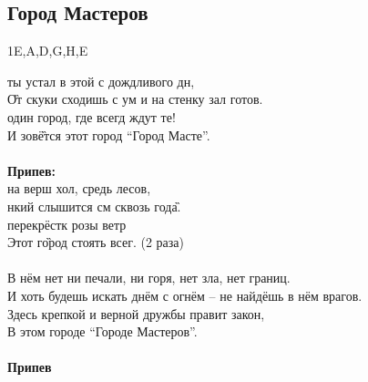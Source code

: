 \documentclass[fleqn,a5paper,12pt,twoside]{guitartabs}
\newcommand{\musSharp}{\texttt{\#}}
\begin{document}
\subsection*{Город Мастеров}
    \begin {tabline}{1}{}{}{E,A,D,G,H,E}
    \end {tabline}
     ты устал в этой с дождливого дн,\\
    \G{От} скуки сходишь с ум и на стенку зал готов.\\
     один город, где всегд ждут те!\\
    И зов\G{ётся} этот город\A{} ``Город Масте''.\\
    \\
    \-\hspace{10mm}\textbf{Припев:}\\
    \-\hspace{10mm} на верш хол, средь лесов,\\
    \-\hspace{10mm}нкий слышится см сквозь год\G{а}.\\
    \-\hspace{10mm} перекрёстк розы ветр\\
    \-\hspace{10mm}Этот г\G{ород} \CHORD{F\musSharp/A}{будет} стоять всег. (2 раза)\\
    \\
    В нём нет ни печали, ни горя, нет зла, нет границ.\\
    И хоть будешь искать днём с огнём -- не найдёшь в нём врагов.\\
    Здесь крепкой и верной дружбы правит закон,\\
    В этом городе ``Городе Мастеров''.\\
    \\
    \-\hspace{10mm}\textbf{Припев}\\
\newpage
{}%
\end{document}

